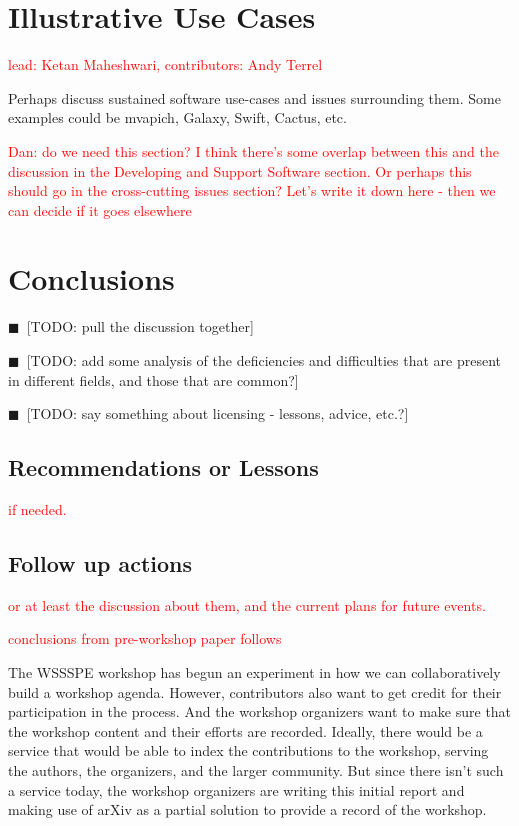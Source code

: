 \documentclass[11pt, oneside]{amsart}
\newcommand{\todo}[1]{{\color{blue}$\blacksquare$~\textsf{[TODO: #1]}}}
\newcommand{\note}[1]{ {\textcolor{red}    { #1 }}}
\begin{document}
\section{Illustrative Use Cases} \label{sec:use-cases}

\note{lead: Ketan Maheshwari, contributors: Andy Terrel}

Perhaps discuss sustained software use-cases and issues surrounding
them. Some examples could be mvapich, Galaxy, Swift, Cactus, etc.

\note{Dan: do we need this section?  I think there's some overlap
  between this and the discussion in the Developing and Support
  Software section.  Or perhaps this should go in the cross-cutting
  issues section?  Let's write it down here - then we can decide if it goes elsewhere}

\section{Conclusions} \label{sec:conclusions}


\todo{pull the discussion together}

\todo{add some analysis of the deficiencies and difficulties that are
  present in different fields, and those that are common?}

\todo{say something about licensing - lessons, advice, etc.?}

\subsection{Recommendations or Lessons}

\note{if needed.}

\subsection{Follow up actions}

\note{or at least the discussion about them, and the current plans for
  future events.}

\note{conclusions from pre-workshop paper follows}

The WSSSPE workshop has begun an experiment in how we can
collaboratively build a workshop agenda. However, contributors also
want to get credit for their participation in the process. And the
workshop organizers want to make sure that the workshop content and
their efforts are recorded.  Ideally, there would be a service that
would be able to index the contributions to the workshop, serving the
authors, the organizers, and the larger community. But since there
isn't such a service today, the workshop organizers are writing this
initial report and making use of arXiv as a partial solution to
provide a record of the workshop.
\end{document}
